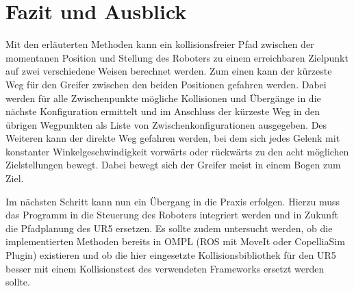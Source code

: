 \cleardoublepage
\chapter{Fazit und Ausblick}

Mit den erläuterten Methoden kann ein kollisionsfreier Pfad zwischen der momentanen Position und Stellung des Roboters zu einem erreichbaren Zielpunkt auf zwei verschiedene Weisen berechnet werden.
Zum einen kann der kürzeste Weg für den Greifer zwischen den beiden Positionen gefahren werden.
Dabei werden für alle Zwischenpunkte mögliche Kollisionen und Übergänge in die nächste Konfiguration ermittelt und im Anschluss der kürzeste Weg in den übrigen Wegpunkten als Liste von Zwischenkonfigurationen ausgegeben.
Des Weiteren kann der direkte Weg gefahren werden, bei dem sich jedes Gelenk mit konstanter Winkelgeschwindigkeit vorwärts oder rückwärts zu den acht möglichen Zielstellungen bewegt.
Dabei bewegt sich der Greifer meist in einem Bogen zum Ziel.

Im nächsten Schritt kann nun ein Übergang in die Praxis erfolgen.
Hierzu muss das Programm in die Steuerung des Roboters integriert werden und in Zukunft die Pfadplanung des UR5 ersetzen.
Es sollte zudem untersucht werden, ob die implementierten Methoden bereits in OMPL (ROS mit MoveIt oder CopelliaSim Plugin) existieren und ob die hier eingesetzte Kollisionsbibliothek für den UR5 besser mit einem Kollisionstest des verwendeten Frameworks ersetzt werden sollte.